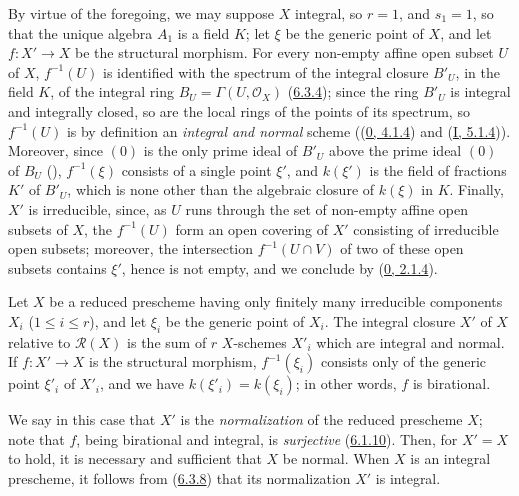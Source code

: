 By virtue of the foregoing, we may suppose $X$ integral, so $r=1$, and
$s_1=1$, so that the unique algebra $A_1$ is a field $K$; let $\xi$ be the
generic point of $X$, and let $f:X'\to X$ be the structural morphism. For
every non-empty affine open subset $U$ of $X$, $f^{-1}(U)$ is identified with
the spectrum of the integral closure $B'_U$, in the field $K$, of the
integral ring $B_U=\Gamma(U,\mathcal{O}_X)$ (\hyperref[II.6.3.4]{6.3.4});
since the ring $B'_U$ is integral and integrally closed, so are the local
rings of the points of its spectrum, so $f^{-1}(U)$ is by definition an
\emph{integral and normal} scheme ((\hyperref[0.4.1.4]{0, 4.1.4}) and
(\hyperref[I.5.1.4]{I, 5.1.4})). Moreover, since $(0)$ is the only prime
ideal of $B'_U$ above the prime ideal $(0)$ of $B_U$
(\cite[vol.~I, p.~259]{I-13}), $f^{-1}(\xi)$ consists of a single point
$\xi'$, and $k(\xi')$ is the field of fractions $K'$ of $B'_U$, which is none
other than the algebraic closure of $k(\xi)$ in $K$. Finally, $X'$ is
irreducible, since, as $U$ runs through the set of non-empty affine open
subsets of $X$, the $f^{-1}(U)$ form an open covering of $X'$ consisting of
irreducible open subsets; moreover, the intersection $f^{-1}(U\cap V)$ of
two of these open subsets contains $\xi'$, hence is not empty, and we
conclude by (\hyperref[0.2.1.4]{0, 2.1.4}).

\begin{corollary}[6.3.8]
\label{II.6.3.8}
Let $X$ be a reduced prescheme having only finitely many irreducible
components $X_i$ ($1\leq i\leq r$), and let $\xi_i$ be the generic point of
$X_i$. The integral closure $X'$ of $X$ relative to $\mathcal{R}(X)$ is the
sum of $r$ $X$-schemes $X'_i$ which are integral and normal. If $f:X'\to X$
is the structural morphism, $f^{-1}(\xi_i)$ consists only of the generic
point $\xi'_i$ of $X'_i$, and we have $k(\xi'_i)=k(\xi_i)$; in other words,
$f$ is birational.
\end{corollary}

We say in this case that $X'$ is the \emph{normalization} of the reduced
prescheme $X$; note that $f$, being birational and integral, is
\emph{surjective} (\hyperref[II.6.1.10]{6.1.10}). Then, for $X'=X$ to
hold, it is necessary and sufficient that $X$ be normal. When $X$ is an
integral prescheme, it follows from (\hyperref[II.6.3.8]{6.3.8}) that its
normalization $X'$ is integral.

